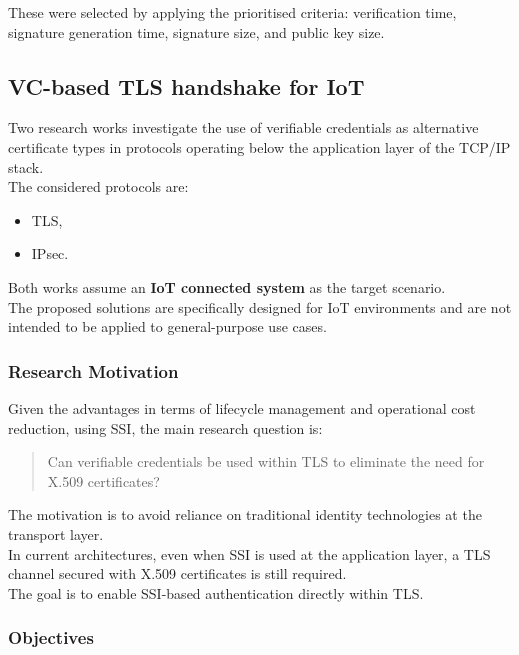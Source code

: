 \noindent
These were selected by applying the prioritised criteria: verification time, signature generation time, signature size, and public key size.


\subsection{VC-based TLS handshake for IoT}

Two research works investigate the use of verifiable credentials as alternative certificate types in protocols operating below the application layer of the TCP/IP stack.\\  
The considered protocols are:
\begin{itemize}
    \item TLS,
    \item IPsec.
\end{itemize}

\noindent
Both works assume an \textbf{IoT connected system} as the target scenario.\\ 
The proposed solutions are specifically designed for IoT environments and are not intended to be applied to general-purpose use cases.


\subsubsection*{Research Motivation}

\noindent
Given the advantages in terms of lifecycle management and operational cost reduction, using SSI, the main research question is:

\begin{quote}
Can verifiable credentials be used within TLS to eliminate the need for X.509 certificates?
\end{quote}

\noindent
The motivation is to avoid reliance on traditional identity technologies at the transport layer.\\  
In current architectures, even when SSI is used at the application layer, a TLS channel secured with X.509 certificates is still required.\\ 
The goal is to enable SSI-based authentication directly within TLS.

\subsubsection*{Objectives}

